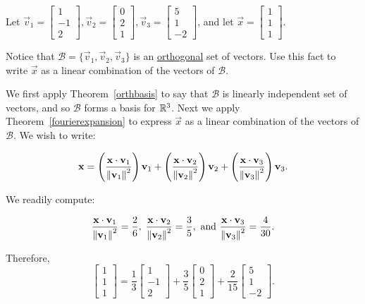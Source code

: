\documentclass{ximera}
\begin{document}
\begin{example}\label{fourier}
Let
$\vec{v}_1= \begin{bmatrix}
1 \\ -1 \\ 2
\end{bmatrix},
\vec{v}_2= \begin{bmatrix}
0 \\ 2 \\ 1 
\end{bmatrix},
\vec{v}_3 =\begin{bmatrix}
5 \\ 1 \\ -2
\end{bmatrix}$,
and let
$\vec{x} =\begin{bmatrix}
1 \\ 1 \\ 1
\end{bmatrix}$.  

Notice that $\mathcal{B}=\{ \vec{v}_1, \vec{v}_2, \vec{v}_3\}$
is an \underline{orthogonal} set of vectors.  Use this fact to write $\vec{x}$ as  a linear combination of the vectors of $\mathcal{B}$.

\begin{explanation}
We first apply Theorem~\ref{orthbasis} to say that $\mathcal{B}$ is linearly independent set of vectors, and so $\mathcal{B}$ forms a basis for $\mathbb{R}^3$. Next we apply Theorem~\ref{fourierexpansion} to express $\vec{x}$ as  a linear combination of the vectors of $\mathcal{B}$.  We wish to write:

\[
\mathbf{x}   =
\left(\frac{\mathbf{x}\cdot \mathbf{v}_1}{\left\lVert\mathbf{v}_1\right\rVert^2}\right) \mathbf{v}_1 +
\left(\frac{\mathbf{x}\cdot \mathbf{v}_2}{\left\lVert\mathbf{v}_2\right\rVert^2}\right) \mathbf{v}_2 +
\left(\frac{\mathbf{x}\cdot \mathbf{v}_3}{\left\lVert\mathbf{v}_3\right\rVert^2}\right) \mathbf{v}_3.
\]

We readily compute:

\[
\frac{\mathbf{x}\cdot\mathbf{v}_1}{\left\lVert\mathbf{v}_1\right\rVert^2} = \frac{2}{6}, \;
\frac{\mathbf{x}\cdot\mathbf{v}_2}{\left\lVert\mathbf{v}_2\right\rVert^2} = \frac{3}{5},
\mbox{ and }
\frac{\mathbf{x}\cdot\mathbf{v}_3}{\left\lVert\mathbf{v}_3\right\rVert^2} = \frac{4}{30}.\]

Therefore,
\[ \begin{bmatrix}
1 \\ 1 \\ 1
\end{bmatrix}
= \frac{1}{3}\begin{bmatrix}
1 \\ -1 \\ 2
\end{bmatrix}
+\frac{3}{5}\begin{bmatrix}
0 \\ 2 \\ 1
\end{bmatrix}
+\frac{2}{15}\begin{bmatrix}
5 \\ 1 \\ -2
\end{bmatrix}.\]
\end{explanation} 
\end{example}
\end{document}
